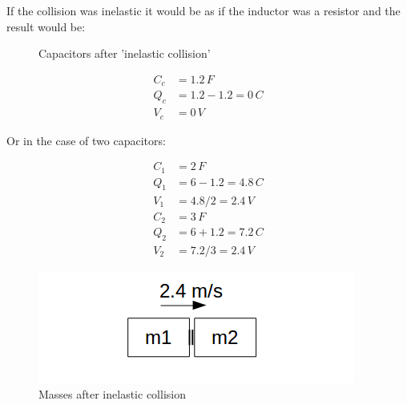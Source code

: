 \documentclass[]{../common/elementary-physics}
\begin{document}
If the collision was inelastic it would be as if the inductor was a resistor and the result would be:

\begin{figure}[ht] \centering
	\qquad
	\caption{Capacitors after 'inelastic collision'}
\end{figure}

\begin{subequations}
\begin{align}
C_c &= 1.2 \, F \\
Q_c &= 1.2 - 1.2 = 0 \, C \\
V_c &= 0 \, V
\end{align}
\end{subequations}

Or in the case of two capacitors:

\begin{subequations}
\begin{align}
C_1 &= 2 \, F \\
Q_1 &= 6 - 1.2 = 4.8 \, C \\
V_1 &= 4.8 / 2 = 2.4 \, V \\
C_2 &= 3 \, F \\
Q_2 &= 6 + 1.2 = 7.2 \, C \\
V_2 &= 7.2 / 3 = 2.4 \, V
\end{align}
\end{subequations}

\begin{figure}[ht] \centering
	\includegraphics[scale=.5]{mms2} \caption{Masses after inelastic collision}
\end{figure}
\end{document}
